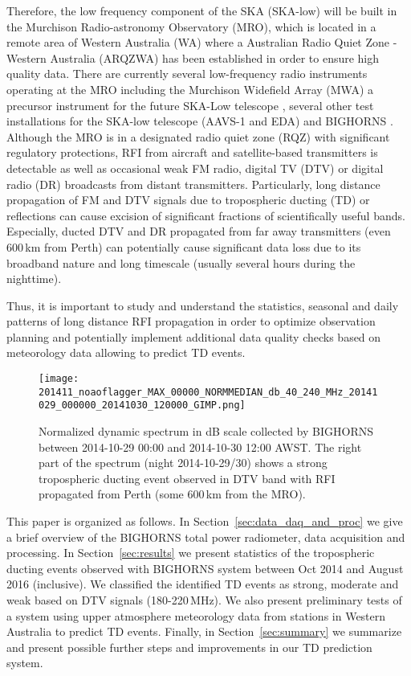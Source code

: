 \documentclass{article}
\begin{document}
Therefore, the low frequency component of the SKA (SKA-low) will be built in the Murchison Radio-astronomy Observatory (MRO), which is located in a remote area of Western Australia (WA) where a Australian Radio Quiet Zone - Western Australia (ARQZWA) \citep{rqz} has been established in order to ensure high quality data. 
There are currently several low-frequency radio instruments operating at the MRO including the Murchison Widefield Array (MWA) \cite{2013PASA...30....7T} a precursor instrument for the future SKA-Low telescope \cite{2015arXiv151001515S}, several other test installations for the SKA-low telescope (AAVS-1 and EDA) and BIGHORNS \cite{2015PASA...32....4S}.
Although the MRO is in a designated radio quiet zone (RQZ) with significant regulatory protections, RFI from aircraft and satellite-based transmitters is detectable as well as occasional weak FM radio, digital TV (DTV) or digital radio (DR) broadcasts from distant transmitters.
Particularly, long distance propagation of FM and DTV signals due to tropospheric ducting (TD) \cite{tropo_ducting} or reflections can cause excision of significant fractions of scientifically useful bands. 
Especially, ducted DTV and DR propagated from far away transmitters (even 600\,km from Perth) can potentially cause significant data loss due to its broadband nature and long timescale (usually several hours during the nighttime).

Thus, it is important to study and understand the statistics, seasonal and daily patterns of long distance RFI propagation in order to optimize observation planning and potentially implement additional data quality checks based on meteorology data
allowing to predict TD events.

\begin{figure*}[]
\centering
\texttt{[image: 201411\_noaoflagger\_MAX\_00000\_NORMMEDIAN\_db\_40\_240\_MHz\_20141029\_000000\_20141030\_120000\_GIMP.png]}
\caption{Normalized dynamic spectrum in dB scale collected by BIGHORNS between 2014-10-29 00:00 and 2014-10-30 12:00 AWST. The right part of the spectrum (night 2014-10-29/30) shows a strong tropospheric ducting event observed in DTV band with RFI propagated from Perth (some 600\,km from the MRO).}
\label{fig:bighorns_ducting_noducting}
\end{figure*}

This paper is organized as follows. In Section~\ref{sec:data_daq_and_proc} we give a brief overview of the BIGHORNS total power radiometer, data acquisition and processing.
In Section~\ref{sec:results} we present statistics of the tropospheric ducting events observed with BIGHORNS system between Oct 2014 and August 2016 (inclusive). We classified the identified TD events as strong, moderate and weak based on DTV signals (180-220\,MHz). 
We also present preliminary tests of a system using upper atmosphere meteorology data from stations in Western Australia to predict TD events. 
Finally, in Section~\ref{sec:summary} we summarize and present possible further steps and improvements in our TD prediction system.
\end{document}
